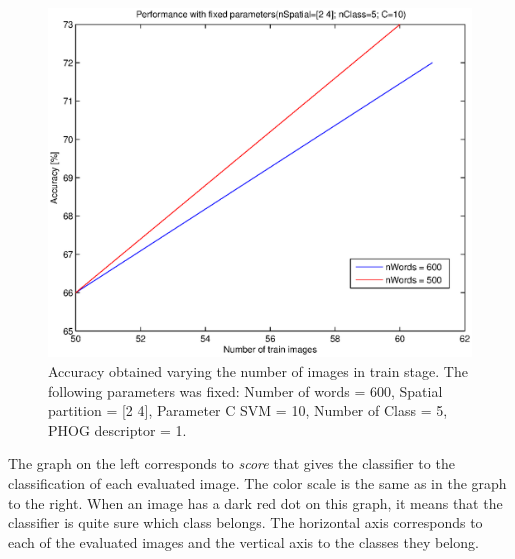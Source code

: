 \documentclass[10pt,twocolumn,letterpaper]{article}
\begin{document}
\begin{figure}[h]
\begin{center}
\includegraphics[width=1\linewidth]{images/nTrain1.eps}
\end{center}
   \caption{
Accuracy obtained varying the number of images in train stage. The following parameters was fixed: Number of words = 600, Spatial partition = [2 4], Parameter C SVM = 10, Number of Class = 5, PHOG descriptor = 1.
   }
\label{nTrain1}
\end{figure}

The graph on the left corresponds to \textit{score} that gives the classifier to the classification of each evaluated image. The color scale is the same as in the graph to the right. When an image has a dark red dot on this graph, it means that the classifier is quite sure which class belongs. The horizontal axis corresponds to each of the evaluated images and the vertical axis to the classes they belong.
\end{document}
